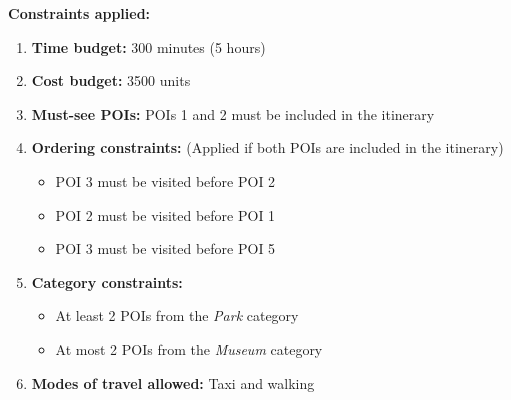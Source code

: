 \begin{table}[H]
\centering
{}
\caption{Taxi Travel Time Matrix (in minutes)}
\label{tab:taxi_time_matrix}
\end{table}


\textbf{Constraints applied:}
\begin{enumerate}[label=\textbf{\arabic*.}]
    \item \textbf{Time budget:} 300 minutes (5 hours)
    \item \textbf{Cost budget:} 3500 units
    \item \textbf{Must-see POIs:} POIs 1 and 2 must be included in the itinerary
    \item \textbf{Ordering constraints:} (Applied if both POIs are included in the itinerary)
    \begin{itemize}
        \item POI 3 must be visited before POI 2
        \item POI 2 must be visited before POI 1
        \item POI 3 must be visited before POI 5
    \end{itemize}
    \item \textbf{Category constraints:}
    \begin{itemize}
        \item At least 2 POIs from the \textit{Park} category
        \item At most 2 POIs from the \textit{Museum} category
    \end{itemize}
    \item \textbf{Modes of travel allowed:} Taxi and walking
\end{enumerate}


